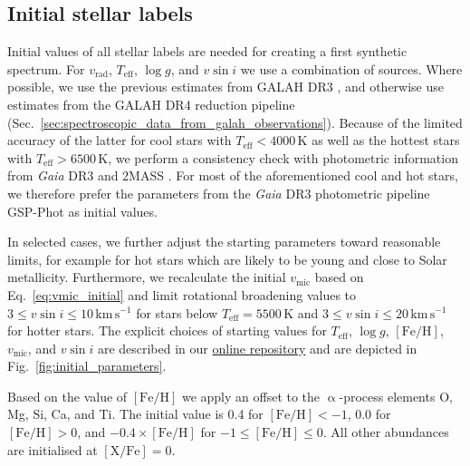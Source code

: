 \documentclass[
  journal=pasa,
  manuscript=research-paper, %
  year=2024,
  volume=37
]{cup-journal}
\newcommand{\Teff}{$T_\mathrm{eff}$\xspace}
\newcommand{\logg}{$\log g$\xspace}
\newcommand{\feh}{$\mathrm{[Fe/H]}$\xspace}
\newcommand{\vmic}{$v_\mathrm{mic}$\xspace}
\newcommand{\vsini}{$v \sin i$\xspace}
\newcommand{\vrad}{$v_\mathrm{rad}$\xspace}
\newcommand{\Gaia}{\textit{Gaia}\xspace}
\begin{document}
\subsection{Initial stellar labels}
\label{sec:initial_stellar_labels}


Initial values of all stellar labels are needed for creating a first synthetic spectrum. For \vrad, \Teff, \logg, and \vsini we use a combination of sources. Where possible, we use the previous estimates from GALAH DR3 \citep{Buder2021}, and otherwise use estimates from the GALAH DR4 reduction pipeline (Sec.~\ref{sec:spectroscopic_data_from_galah_observations}). Because of the limited accuracy of the latter for cool stars with $T_\text{eff} < 4000\,\mathrm{K}$ as well as the hottest stars with $T_\text{eff} > 6500\,\mathrm{K}$, we perform a consistency check with photometric information from \Gaia DR3 \citep{Brown2021} and 2MASS \citep{Skrutskie2006}. For most of the aforementioned cool and hot stars, we therefore prefer the parameters from the \Gaia DR3 photometric pipeline GSP-Phot \citep{Andrae2022,Fouesneau2022} as initial values.

In selected cases, we further adjust the starting parameters toward reasonable limits, for example for hot stars which are likely to be young and close to Solar metallicity. Furthermore, we recalculate the initial \vmic based on Eq.~\ref{eq:vmic_initial} and limit rotational broadening values to $3 \leq v \sin i \leq 10\,\mathrm{km\,s^{-1}}$ for stars below $T_\text{eff} = 5500\,\mathrm{K}$ and $3 \leq v \sin i \leq 20\,\mathrm{km\,s^{-1}}$ for hotter stars. The explicit choices of starting values for \Teff, \logg, \feh, \vmic, and \vsini are described in our \href{https://github.com/svenbuder/GALAH_DR4/blob/main/spectrum_analysis/galah_dr4_initial_parameters.ipynb}{online repository} and are depicted in Fig.~\ref{fig:initial_parameters}.

Based on the value of \feh we apply an offset to the $\upalpha$-process elements O, Mg, Si, Ca, and Ti. The initial value is 0.4 for $\mathrm{[Fe/H]} < -1$, 0.0 for $\mathrm{[Fe/H]} > 0$, and $-0.4 \times \mathrm{[Fe/H]}$ for $-1 \leq \mathrm{[Fe/H]} \leq 0$. All other abundances are initialised at $\mathrm{[X/Fe]} = 0$.
\end{document}
